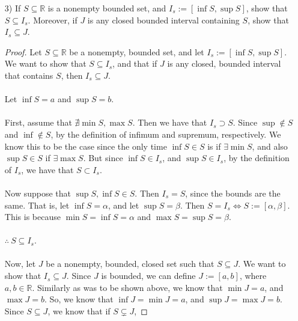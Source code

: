 \documentclass[12pt,letterpaper]{article}
\theoremstyle{case}
\newtheorem{case}{Case}
\begin{document}
\begin{enumerate}
\begin{enumerate}
\begin{proof}
\begin{case}
				\\\\By the Archimedian property, we have that $\forall s \in S,\ \exists n \in \mathbb{N},\ \text{s.t.}\ n \leq s < n+1$.
				\\\\Define an interval $I := [\lfloor a \rfloor, \lceil b \rceil]$. Thus we now have that $\lfloor a \rfloor \leq \inf S$, and that $\sup S \leq \lceil b \rceil$. Hence $S \subseteq I$.
				\\\\$\therefore\ I$ is a closed, bounded interval by construction, such that $S \subseteq I$.
			\end{case}
		\end{proof}
		\item[3)] If $S \subseteq \mathbb{R}$ is a nonempty bounded set, and $I_s := [\inf S, \sup S]$, show that $S\subseteq I_s$. Moreover, if $J$ is any closed bounded interval containing $S$, show that $I_s \subseteq J$.
		\begin{proof}
			Let $S \subseteq \mathbb{R}$ be a nonempty, bounded set, and let $I_s := [\inf S, \sup S]$. We want to show that $S \subseteq I_s$, and that if $J$ is any closed, bounded interval that contains $S$, then $I_s \subseteq J$.
			\\\\Let $\inf S = a$ and $\sup S = b$.
			\\\\First, assume that $\nexists \min S, \max S$. Then we have that $I_s \supset S$. Since $\sup \notin S$ and $\inf \notin S$, by the definition of infimum and supremum, respectively. We know this to be the case since the only time $\inf S \in S$ is if $\exists \min S$, and also $\sup S \in S$ if $\exists \max S$. But since $\inf S \in I_s$, and $\sup S \in I_s$, by the definition of $I_s$, we have that $S \subset I_s$.
			\\\\Now suppose that $\sup S, \inf S \in S$. Then $I_s = S$, since the bounds are the same. That is, let $\inf S = \alpha$, and let $\sup S = \beta$. Then $S = I_s \iff S:= [\alpha, \beta]$. This is because $\min S = \inf S = \alpha$ and $\max S = \sup S = \beta$.
			\\\\$\therefore\ S \subseteq I_s$.
			\\\\Now, let $J$ be a nonempty, bounded, closed set such that $S \subseteq J$. We want to show that $I_s \subseteq J$. Since $J$ is bounded, we can define $J := [a,b]$, where $a,b \in \mathbb{R}$. Similarly as was to be shown above, we know that $\min J = a$, and $\max J = b$. So, we know that $\inf J = \min J = a$, and $\sup J = \max J = b$. Since $S \subseteq J$, we know that if $S \subsetneq J$,

\end{proof}
\end{enumerate}
\end{enumerate}
\end{document}
